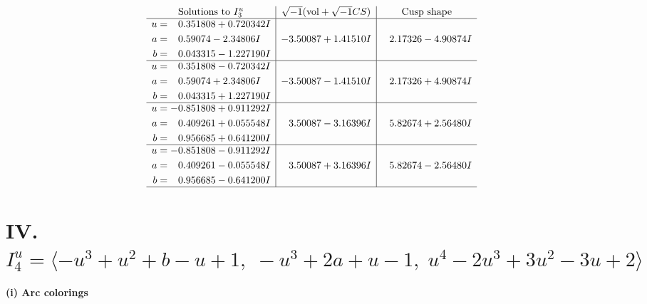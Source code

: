\documentclass[1p]{elsarticle_modified}
\theoremstyle{definition}
\newcommand{\I}{\sqrt{-1}}
\begin{document}
$$\begin{array}{c|c|c}  
\text{Solutions to }I^u_{3}& \I (\text{vol} + \sqrt{-1}CS) & \text{Cusp shape}\\
 \hline 
\begin{aligned}
u &= \phantom{-}0.351808 + 0.720342 I \\
a &= \phantom{-}0.59074 - 2.34806 I \\
b &= \phantom{-}0.043315 - 1.227190 I\end{aligned}
 & -3.50087 + 1.41510 I & \phantom{-}2.17326 - 4.90874 I \\ \hline\begin{aligned}
u &= \phantom{-}0.351808 - 0.720342 I \\
a &= \phantom{-}0.59074 + 2.34806 I \\
b &= \phantom{-}0.043315 + 1.227190 I\end{aligned}
 & -3.50087 - 1.41510 I & \phantom{-}2.17326 + 4.90874 I \\ \hline\begin{aligned}
u &= -0.851808 + 0.911292 I \\
a &= \phantom{-}0.409261 + 0.055548 I \\
b &= \phantom{-}0.956685 + 0.641200 I\end{aligned}
 & \phantom{-}3.50087 - 3.16396 I & \phantom{-}5.82674 + 2.56480 I \\ \hline\begin{aligned}
u &= -0.851808 - 0.911292 I \\
a &= \phantom{-}0.409261 - 0.055548 I \\
b &= \phantom{-}0.956685 - 0.641200 I\end{aligned}
 & \phantom{-}3.50087 + 3.16396 I & \phantom{-}5.82674 - 2.56480 I\\
 \hline 
 \end{array}$$\newpage\newpage\renewcommand{\arraystretch}{1}
\centering \section*{IV. $I^u_{4}= \langle - u^3+u^2+b- u+1,\;- u^3+2 a+u-1,\;u^4-2 u^3+3 u^2-3 u+2 \rangle$}
\flushleft \textbf{(i) Arc colorings}\\
\end{document}
